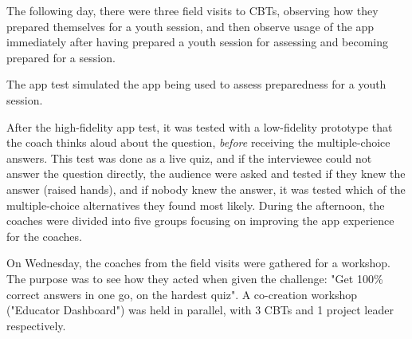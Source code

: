 The following day, there were three field visits to CBTs, observing how they prepared themselves for a youth session, and then observe usage of the app immediately after having prepared a youth session for assessing and becoming prepared for a session.

The app test simulated the app being used to assess preparedness for a youth session.

After the high-fidelity app test, it was tested with a low-fidelity prototype that the coach thinks aloud about the question, \textit{before} receiving the multiple-choice answers. This test was done as a live quiz, and if the interviewee could not answer the question directly, the audience were asked and tested if they knew the answer (raised hands), and if nobody knew the answer, it was tested which of the multiple-choice alternatives they found most likely. During the afternoon, the coaches were divided into five groups focusing on improving the app experience for the coaches.

On Wednesday, the coaches from the field visits were gathered for a workshop. The purpose was to see how they acted when given the challenge: "Get 100\% correct answers in one go, on the hardest quiz". A co-creation workshop ("Educator Dashboard") was held in parallel, with 3 CBTs and 1 project leader respectively.
